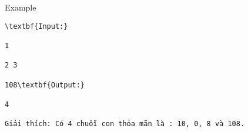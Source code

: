Example
\begin{verbatim}
\textbf{Input:}

1

2 3

108\textbf{Output:}

4

Giải thích: Có 4 chuỗi con thỏa mãn là : 10, 0, 8 và 108.\end{verbatim}